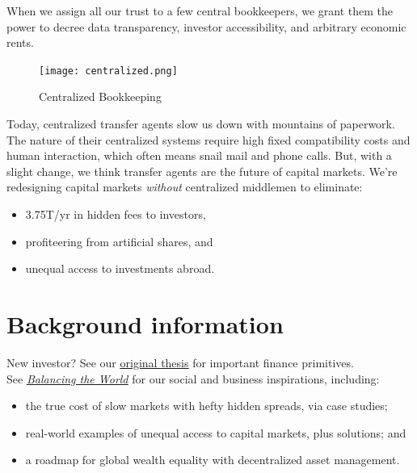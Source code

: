 \documentclass[11pt, english]{article}
\begin{document}
\begin{multicols}{2}

When we assign all our trust to a few central bookkeepers, we grant them the power to decree data transparency, investor accessibility, and arbitrary economic rents.

\begin{figure}[H]
    \raggedleft 
    \texttt{[image: centralized.png]}
    \caption{Centralized Bookkeeping}
    \label{fig:centralized}
\end{figure}

Today, centralized transfer agents slow us down with mountains of paperwork. The nature of their centralized systems require high fixed compatibility costs and human interaction, which often means snail mail and phone calls. But, with a slight change, we think transfer agents are the future of capital markets. We're redesigning capital markets \hbox{\textit{without}} centralized middlemen to eliminate:
\begin{itemize}
    \item 3.75T/yr in hidden fees to investors,
    
    \item profiteering from artificial shares, and
    
    \item unequal access to investments abroad.
\end{itemize}



\section{Background information}

New investor? See our \underline{\href{http://thesis.blocktransfer.io}{original thesis}} for important finance primitives.\\

\noindent See \href{http://impact.blocktransfer.io}{\underline{\textit{Balancing the World}}} for our social and business inspirations, including:
\begin{itemize}
    \item the true cost of slow markets with hefty hidden spreads, via case studies;
    
    \item real-world examples of unequal access to capital markets, plus solutions; and
    
    \item a roadmap for global wealth equality with decentralized asset management.
\end{itemize}


\end{multicols}
\end{document}
